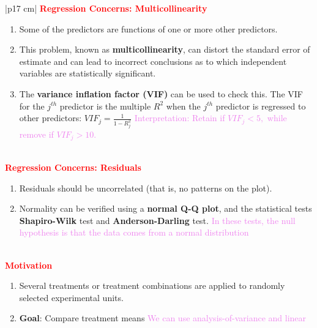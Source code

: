 \documentclass[a4paper,11pt]{article}
\begin{document}
\begin{longtable}{|p{17 cm}|}
\hline
\textbf{\textcolor{red}{Regression Concerns: Multicollinearity}}\\
\begin{minipage}{\linewidth} 
\begin{enumerate}
[noitemsep, topsep=0pt]
    \item Some of the predictors are functions of one or more other predictors.
    \item This problem, known as \textbf{multicollinearity}, can distort the standard error of estimate and can lead to incorrect conclusions as to which independent variables are statistically significant.
    \item The \textbf{variance inflation factor (VIF)} can be used to check this. The VIF for the
    $j^{th}$ predictor is the multiple $R^2$ when the $j^{th}$ predictor is regressed to other predictors:
    \(
    VIF_j=\frac{1}{1-R_j^2}
    \)
    \textcolor{violet}{Interpretation: Retain if $VIF_j<5,$ while remove if $VIF_j>10.$}
\end{enumerate}
\end{minipage} \\
\hline  
\textbf{\textcolor{red}{Regression Concerns: Residuals}} \\
\begin{minipage}{\linewidth} 
\begin{enumerate}
[noitemsep, topsep=0pt]
    \item Residuals should be uncorrelated (that is, no patterns on the plot).
    \item Normality can be verified using a \textbf{normal Q-Q plot}, and the statistical tests \textbf{Shapiro-Wilk} test and \textbf{Anderson-Darling} test.
    \newline \textcolor{violet}{In these tests, the null hypothesis is that the data comes from a normal distribution}
\end{enumerate}
\end{minipage} \\
\hline
\textbf{\textcolor{red}{Motivation}} \\
\begin{minipage}{\linewidth} 
\begin{enumerate}
[noitemsep, topsep=0pt]
    \item Several treatments or treatment combinations are applied to randomly selected experimental units.
    \item \textbf{Goal}: Compare treatment means 
    \newline \textcolor{violet}{We can use analysis-of-variance and linear
}
\end{enumerate}
\end{minipage}
\end{longtable}
\end{document}
